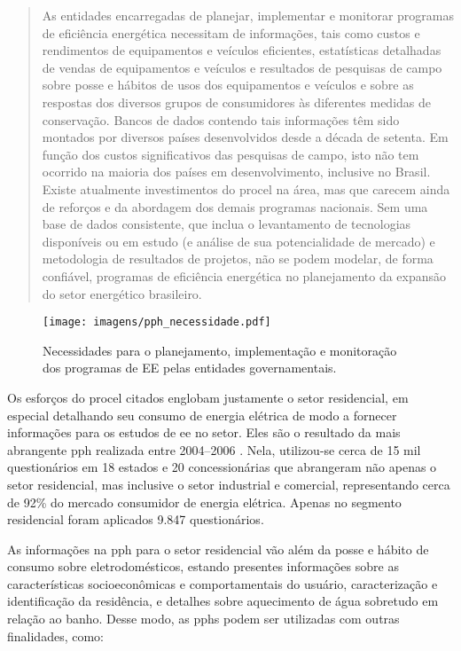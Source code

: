\begin{quote}
As entidades encarregadas de planejar, implementar e monitorar
programas de eficiência energética necessitam de informações, tais
como custos e rendimentos de equipamentos e veículos eficientes,
estatísticas detalhadas de vendas de equipamentos e veículos e
resultados de pesquisas de campo sobre posse e hábitos de usos dos
equipamentos e veículos e sobre as respostas dos diversos grupos de
consumidores às diferentes medidas de conservação. Bancos de dados
contendo tais informações têm sido montados por diversos países
desenvolvidos desde a década de setenta. Em função dos custos
significativos das pesquisas de campo, isto não tem ocorrido na
maioria dos países em desenvolvimento, inclusive no Brasil. Existe
atualmente investimentos do \gls{procel} na área, mas que carecem
ainda de reforços e da abordagem dos demais programas nacionais. Sem
uma base de dados consistente, que inclua o levantamento de
tecnologias disponíveis ou em estudo (e análise de sua potencialidade
de mercado) e metodologia de resultados de projetos, não se podem
modelar, de forma confiável, programas de eficiência energética no
planejamento da expansão do setor energético brasileiro.
\end{quote}

\begin{figure}[h!t]
\centering
\texttt{[image: imagens/pph\_necessidade.pdf]}
\caption{Necessidades para o planejamento, implementação e monitoração
dos programas de EE pelas entidades governamentais.}
\label{fig:pph_necessidades}
\end{figure}

Os esforços do \gls{procel} citados englobam justamente o setor
residencial, em especial detalhando seu consumo de energia elétrica de
modo a fornecer informações para os estudos de \gls{ee} no setor. Eles
são o resultado da mais abrangente \gls{pph} realizada entre
2004--2006 \cite{result_procel_2005,site_pesquisas_procel}.  Nela,
utilizou-se cerca de 15 mil questionários em 18 estados e 20
concessionárias que abrangeram não apenas o setor residencial, mas
inclusive o setor industrial e comercial, representando cerca de 92\%
do mercado consumidor de energia elétrica.  Apenas no segmento
residencial foram aplicados 9.847 questionários.

As informações na \gls{pph} para o setor residencial vão além da posse
e hábito de consumo sobre eletrodomésticos, estando presentes
informações sobre as características socioeconômicas e comportamentais
do usuário, caracterização e identificação da residência, e detalhes
sobre aquecimento de água sobretudo em relação ao banho. Desse modo,
as \glspl{pph} podem ser utilizadas com outras finalidades, como:

